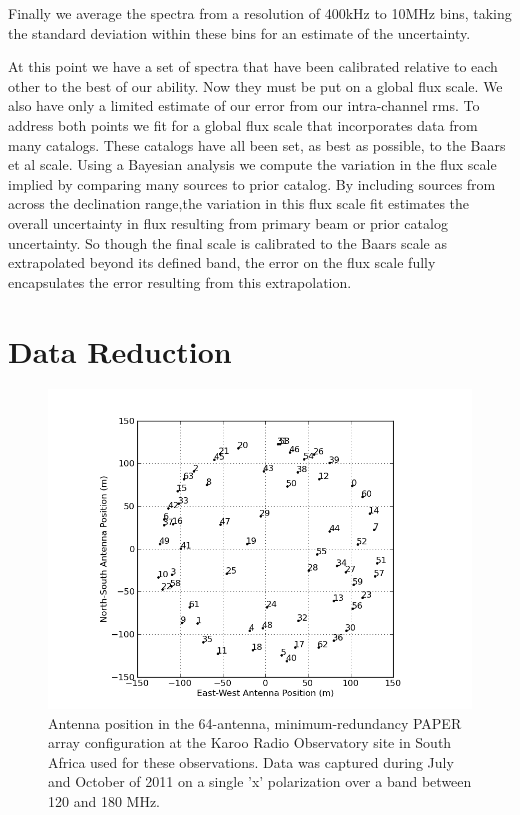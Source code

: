 \documentclass[preprint]{aastex}
\begin{document}
 Finally we average the spectra from a resolution of 400kHz to 10MHz bins, taking the standard deviation within these bins
 for an estimate of the uncertainty.

At this point we have a set of spectra that have been calibrated relative to each other to the best of our ability. Now 
they must be put on a global flux scale. We also have only a limited estimate of our error from our intra-channel
rms.  To address both points we fit for a global flux scale that incorporates data from many catalogs. These catalogs
have all been set, as best as possible, to the Baars et al scale.  Using a Bayesian analysis we compute the 
variation in the flux scale implied by comparing many sources to prior catalog. By including sources from across
the declination range,the variation in this flux scale fit estimates the overall uncertainty in flux resulting from primary beam 
or prior catalog uncertainty.  So though the final scale is calibrated to the Baars scale as extrapolated beyond its
defined band, the error on the flux scale fully encapsulates the error resulting from this extrapolation.

 
 \section{Data Reduction}
 \label{sec:Observations}


\begin{figure}\centering
\includegraphics[width=0.85\columnwidth]{plots/antpos.png}
\caption{Antenna position in the 64-antenna, minimum-redundancy PAPER array configuration at the Karoo Radio Observatory site in South Africa used for these observations.
Data was captured during July and October of 2011 on a single 'x' polarization over a band between 120 and 180 MHz.
}\label{fig:antpos}
\end{figure}
\end{document}
